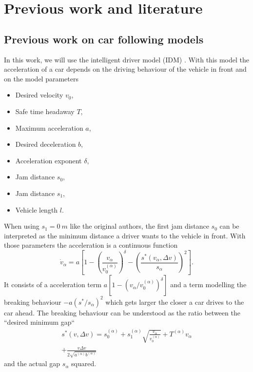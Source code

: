 \section{Previous work and literature}
\label{sec:previos_work}

\subsection{Previous work on car following models}
\label{sec:previous_work:car_following}

In this work, we will use the intelligent driver model (IDM) \cite{PhysRevE.62.1805}. With this model the acceleration
of a car depends on the driving behaviour of the vehicle in front and on the model parameters
\begin{itemize}
  \item Desired velocity $v_0$,
  \item Safe time headaway $T$,
  \item Maximum acceleration $a$,
  \item Desired deceleration $b$,
  \item Acceleration exponent $\delta$,
  \item Jam distance $s_0$,
  \item Jam distance $s_1$,
  \item Vehicle length $l$.
\end{itemize}
When using $s_1 = \SI{0}{m}$ like the original authors, the first jam
distance $s_0$ can be interpreted as the minimum distance a driver wants to the vehicle in front. With those parameters
the acceleration is a continuous function
\begin{equation}
  \dot v_\alpha = a \left[1 - \left(\frac{v_\alpha}{v_0^{(\alpha)}}\right)^\delta -
    \left(\frac{s^*(v_\alpha, \Delta v)}{s_\alpha}\right)^2
  \right].
\end{equation}
It consists of a acceleration term $a [1 - (v_\alpha / v_0^{(\alpha)})^\delta]$ and a term modelling the breaking
behaviour $-a (s^* / s_\alpha)^2$ which gets larger the closer a car drives to the car ahead. The breaking behaviour
can be understood as the ratio between the ``desired minimum gap``
\begin{multline}
  s^*(v, \Delta v) = s_0^{(\alpha)} + s_1^{(\alpha)} \sqrt{\frac{v_\alpha}{v_0^{(\alpha)}}} + T^{(\alpha)}v_\alpha
  \\
  + \frac{v\Delta v}{2 \sqrt{a^{(\alpha)} b^{(\alpha)}}}
\end{multline}
and the actual gap $s_\alpha$ squared. 

